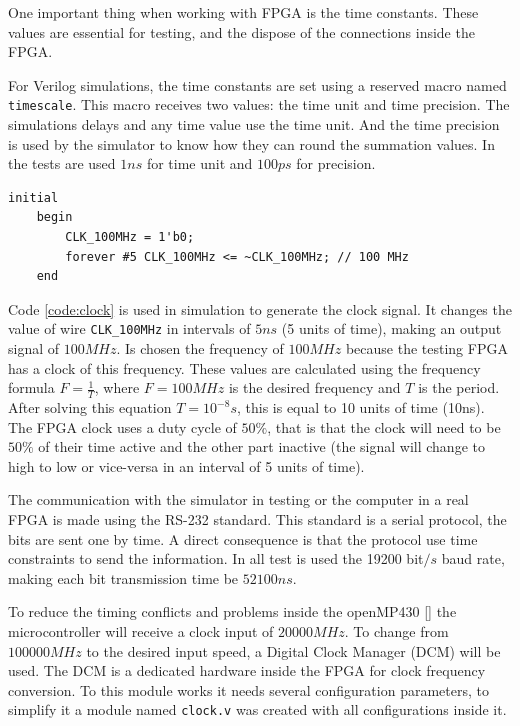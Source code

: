 One important thing when working with FPGA is the time constants. These values are essential for testing, and the dispose of the connections inside the FPGA.

For Verilog simulations, the time constants are set using a reserved macro named \verb|timescale|. This macro receives two values: the time unit and time precision. The simulations delays and any time value use the time unit. And the time precision is used by the simulator to know how they can round the summation values. In the tests are used $1ns$ for time unit and $100ps$ for precision. 

\begin{lstlisting}[caption={Simulation clock signal generator.},label={code:clock}]
initial
	begin
		CLK_100MHz = 1'b0;
		forever #5 CLK_100MHz <= ~CLK_100MHz; // 100 MHz
	end
\end{lstlisting}

Code \ref{code:clock} is used in simulation to generate the clock signal. It changes the value of wire \verb|CLK_100MHz| in intervals of $5ns$ (5 units of time), making an output signal of $100MHz$. Is chosen the frequency of $100MHz$  because the testing FPGA has a clock of this frequency. These values are calculated using the frequency formula $F = \frac{1}{T}$, where $F = 100MHz$ is the desired frequency and $T$ is the period. After solving this equation $T = 10^{-8}s$, this is equal to 10 units of time (10ns). The FPGA clock uses a duty cycle of $50\%$, that is that the clock will need to be $50\%$ of their time active and the other part inactive (the signal will change to high to low or vice-versa in an interval of 5 units of time). 

The communication with the simulator in testing or the computer in a real FPGA is made using the RS-232 standard. This standard is a serial protocol, the bits are sent one by time. A direct consequence is that the protocol use time constraints to send the information. In all test is used the 19200 bit$/s$ baud rate, making each bit transmission time be $52100 ns$.

To reduce the timing conflicts and problems inside the openMP430 [] the microcontroller will receive a clock input of $20000MHz$. To change from $100000MHz$ to the desired input speed, a Digital Clock Manager (DCM) \cite{dcm} will be used.  The DCM is a dedicated hardware inside the FPGA for clock frequency conversion. To this module works it needs several configuration parameters, to simplify it a module named \verb|clock.v| was created with all configurations inside it.

